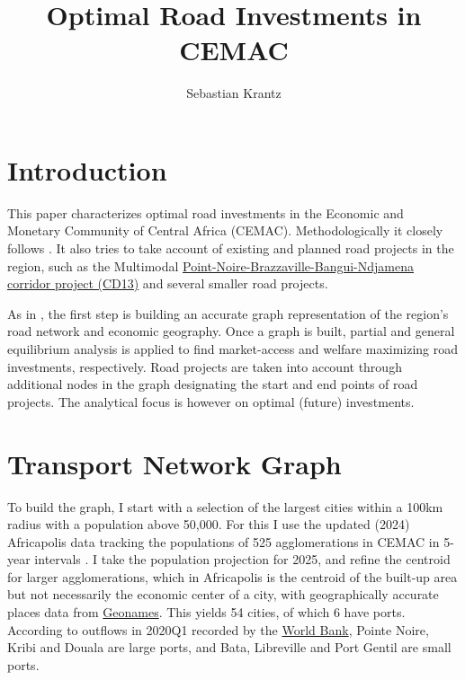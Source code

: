 \documentclass[a4paper]{article}
\title{\textbf{Optimal Road Investments in CEMAC}}
\author{Sebastian Krantz}
\begin{document}
\maketitle

\section{Introduction}

This paper characterizes optimal road investments in the Economic and Monetary Community of Central Africa (CEMAC). Methodologically it closely follows \citet{krantz2024optimal}. It also tries to take account of existing and planned road projects in the region, such as the Multimodal \href{https://www.afdb.org/en/documents/ppm-rca-projet-de-developpement-du-corridor-de-transport-multimodal-pointe-noire-brazzaville-bangui-ndjamena-cd13-phase-1}{Point-Noire-Brazzaville-Bangui-Ndjamena corridor project (CD13)} and several smaller road projects. \newline 

As in \citet{krantz2024optimal}, the first step is building an accurate graph representation of the region's road network and economic geography. Once a graph is built, partial and general equilibrium analysis is applied to find market-access and welfare maximizing road investments, respectively. Road projects are taken into account through additional nodes in the graph designating the start and end points of road projects. The analytical focus is however on optimal (future) investments. 

\section{Transport Network Graph}


To build the graph, I start with a selection of the largest cities within a 100km radius with a population above 50,000. For this I use the updated (2024) Africapolis data tracking the populations of 525 agglomerations in CEMAC in 5-year intervals \citep{africapolis2024}. I take the population projection for 2025, and refine the centroid for larger agglomerations, which in Africapolis is the centroid of the built-up area but not necessarily the economic center of a city, with geographically accurate places data from \href{https://public.opendatasoft.com/explore/dataset/geonames-all-cities-with-a-population-500/table/?disjunctive.country}{Geonames}. This yields 54 cities, of which 6 have ports. According to outflows in 2020Q1 recorded by the \href{https://datacatalog.worldbank.org/search/dataset/0038118/Global---International-Ports}{World Bank}, Pointe Noire, Kribi and Douala are large ports, and Bata, Libreville and Port Gentil are small ports. \newline 
\end{document}
